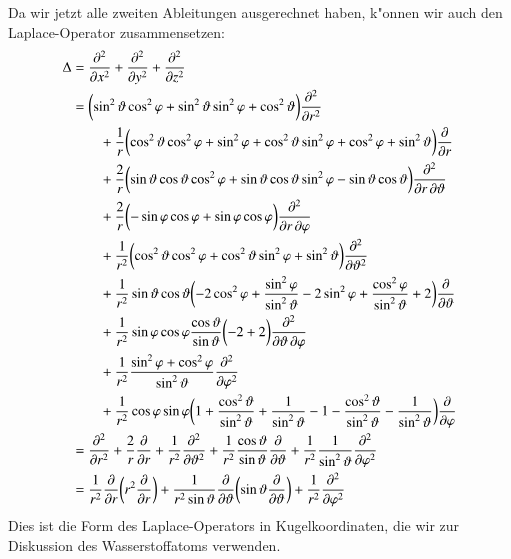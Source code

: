 Da wir jetzt alle zweiten Ableitungen ausgerechnet haben, k"onnen wir auch
den Laplace-Operator zusammensetzen:
\begin{align}
\Delta
&=
\frac{\partial^2}{\partial x^2}+
\frac{\partial^2}{\partial y^2}+
\frac{\partial^2}{\partial z^2}
\notag
\\
&=
\biggl(
\sin^2\vartheta\cos^2\varphi
+
\sin^2\vartheta\sin^2\varphi
+
\cos^2\vartheta
\biggr)
\frac{\partial^2}{\partial r^2}
\notag
\\
&\qquad
+
\frac1r\biggl(
\cos^2\vartheta\cos^2\varphi+\sin^2\varphi
+
\cos^2\vartheta\sin^2\varphi +\cos^2\varphi
+
\sin^2\vartheta
\biggr)
\frac{\partial}{\partial r}
\notag
\\
&\qquad
+
\frac2r\biggl(
\sin\vartheta\cos\vartheta\cos^2\varphi
+
\sin\vartheta\cos\vartheta\sin^2\varphi
-\sin\vartheta\cos\vartheta
\biggr)
\frac{\partial^2}{\partial r\,\partial\vartheta}
\notag
\\
&\qquad
+
\frac{2}{r}
\biggl(
-\sin\varphi\cos\varphi
+ \sin\varphi\cos\varphi
\biggr)
\frac{\partial^2}{\partial r\,\partial\varphi}
\notag
\\
&\qquad
+
\frac1{r^2}
\biggl(
\cos^2\vartheta\cos^2\varphi
+\cos^2\vartheta\sin^2\varphi
+\sin^2\vartheta
\biggr)
\frac{\partial^2}{\partial\vartheta^2}
\notag
\\
&\qquad
+
\frac1{r^2}
\sin\vartheta\cos\vartheta
\biggl(
-2 \cos^2\varphi
	+\frac{\sin^2\varphi}{\sin^2\vartheta}
-2\sin^2\varphi
+\frac{\cos^2\varphi}{\sin^2\vartheta}
+
2
\biggr)
\frac{\partial}{\partial\vartheta}
\notag
\\
&\qquad
+
\frac1{r^2}\sin\varphi\cos\varphi\frac{\cos\vartheta}{\sin\vartheta}
\biggl(
-2+2
\biggr)
\frac{\partial^2}{\partial\vartheta\,\partial\varphi}
\notag
\\
&\qquad
+
\frac1{r^2}\frac{\sin^2\varphi+\cos^2\varphi}{\sin^2\vartheta}
\frac{\partial^2}{\partial\varphi^2}
\notag
\\
&\qquad
+
\frac1{r^2}\cos\varphi\sin\varphi
\biggl(
1+\frac{\cos^2\vartheta}{\sin^2\vartheta}+\frac1{\sin^2\vartheta}
-1-\frac{\cos^2\vartheta}{\sin^2\vartheta}-\frac1{\sin^2\vartheta}
\biggr)
\frac{\partial}{\partial\varphi}
\notag
\\
&=
\frac{\partial^2}{\partial r^2}
+\frac{2}{r}\frac{\partial}{\partial r}
+\frac1{r^2}
\frac{\partial^2}{\partial\vartheta^2}
+
\frac1{r^2}
\frac{\cos\vartheta}{\sin\vartheta}
\frac{\partial}{\partial\vartheta}
+
\frac1{r^2}\frac1{\sin^2\vartheta}\frac{\partial^2}{\partial\varphi^2}
\notag
\\
&=
\frac1{r^2}\frac{\partial}{\partial r}\biggl(
r^2\frac{\partial}{\partial r}
\biggr)
+\frac1{r^2\sin\vartheta}\frac{\partial}{\partial\vartheta}\biggl(
\sin\vartheta\frac{\partial}{\partial\vartheta}
\biggr)
+\frac1{r^2}\frac{\partial^2}{\partial\varphi^2}
\label{laplacekugel}
\end{align}
Dies ist die Form des Laplace-Operators in Kugelkoordinaten, die
wir zur Diskussion des Wasserstoffatoms verwenden.
